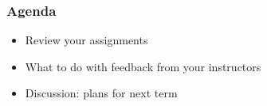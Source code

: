 \documentclass[12pt,article,oneside]{memoir}
\begin{document}
\subsubsection{Agenda}
\begin{itemize}
\item Review your assignments
\item What to do with feedback from your instructors
\item Discussion: plans for next term
\end{itemize}


\newpage
\renewcommand{\bibname}{Reading list}
{}

\end{document}
